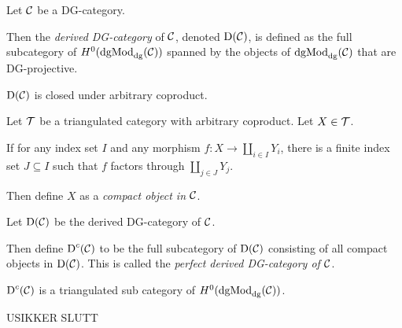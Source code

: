 \begin{definition}
    Let \( {\mathcal{C}} \) be a DG-category.

    Then the \emph{derived DG-category} of \( {\mathcal{C}} \), denoted \( \operatorname{D}({\mathcal{C}}) \), is defined as the full subcategory of \( H^0(\operatorname{dgMod}_{\operatorname{dg}}({\mathcal{C}})) \) spanned by the objects of \( \operatorname{dgMod}_{\operatorname{dg}}({\mathcal{C}}) \) that are DG-projective.
\end{definition}

\begin{proposition}
    \( \operatorname{D}({\mathcal{C}}) \) is closed under arbitrary coproduct.
\end{proposition}

\begin{definition}
    Let \( {\mathcal{T}} \) be a triangulated category with arbitrary coproduct. Let \( X \in {\mathcal{T}} \).
    
    If for any index set \( I \) and any morphism \( f: X \to \coprod_{i \in I} Y_i \), there is a finite index set \( J \subseteq I \) such that \( f \) factors through \( \coprod_{j \in J} Y_j \).
    
    Then define \( X \) as a \emph{compact object in \( {\mathcal{C}} \)}.
\end{definition}

\begin{definition}
    Let \( \operatorname{D}({\mathcal{C}}) \) be the derived DG-category of \( {\mathcal{C}} \).

    Then define \( \operatorname{D}^c({\mathcal{C}}) \) to be the full subcategory of \( \operatorname{D}({\mathcal{C}}) \) consisting of all compact objects in \( \operatorname{D}({\mathcal{C}}) \). This is called the \emph{perfect derived DG-category of \( {\mathcal{C}} \)}.
\end{definition}

\begin{proposition}
    \( \operatorname{D}^c({\mathcal{C}}) \) is a triangulated sub category of \( H^0(\operatorname{dgMod}_{\operatorname{dg}}({\mathcal{C}})) \).
\end{proposition}

USIKKER SLUTT

